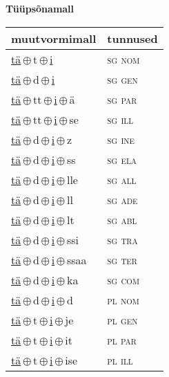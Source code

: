 

\vspace{3.5em}
\noindent \begin{minipage}{\textwidth}
\noindent \textbf{Tüüpsõnamall \,}\\

\begin{sideways}
\begin{tabular}{l l}
muutvormimall & tunnused \\
\hline
\underline{tä}\,$\oplus$\,t\,$\oplus$\,\underline{i} & \textsc{ sg nom } \\
\underline{tä}\,$\oplus$\,d\,$\oplus$\,\underline{i} & \textsc{ sg gen } \\
\underline{tä}\,$\oplus$\,tt\,$\oplus$\,\underline{i}\,$\oplus$\,ä & \textsc{ sg par } \\
\underline{tä}\,$\oplus$\,tt\,$\oplus$\,\underline{i}\,$\oplus$\,se & \textsc{ sg ill } \\
\underline{tä}\,$\oplus$\,d\,$\oplus$\,\underline{i}\,$\oplus$\,z & \textsc{ sg ine } \\
\underline{tä}\,$\oplus$\,d\,$\oplus$\,\underline{i}\,$\oplus$\,ss & \textsc{ sg ela } \\
\underline{tä}\,$\oplus$\,d\,$\oplus$\,\underline{i}\,$\oplus$\,lle & \textsc{ sg all } \\
\underline{tä}\,$\oplus$\,d\,$\oplus$\,\underline{i}\,$\oplus$\,ll & \textsc{ sg ade } \\
\underline{tä}\,$\oplus$\,d\,$\oplus$\,\underline{i}\,$\oplus$\,lt & \textsc{ sg abl } \\
\underline{tä}\,$\oplus$\,d\,$\oplus$\,\underline{i}\,$\oplus$\,ssi & \textsc{ sg tra } \\
\underline{tä}\,$\oplus$\,d\,$\oplus$\,\underline{i}\,$\oplus$\,ssaa & \textsc{ sg ter } \\
\underline{tä}\,$\oplus$\,d\,$\oplus$\,\underline{i}\,$\oplus$\,ka & \textsc{ sg com } \\
\underline{tä}\,$\oplus$\,d\,$\oplus$\,\underline{i}\,$\oplus$\,d & \textsc{ pl nom } \\
\underline{tä}\,$\oplus$\,t\,$\oplus$\,\underline{i}\,$\oplus$\,je & \textsc{ pl gen } \\
\underline{tä}\,$\oplus$\,t\,$\oplus$\,\underline{i}\,$\oplus$\,it & \textsc{ pl par } \\
\underline{tä}\,$\oplus$\,t\,$\oplus$\,\underline{i}\,$\oplus$\,ise & \textsc{ pl ill } \\

\end{tabular}
\end{sideways}
\end{minipage}

